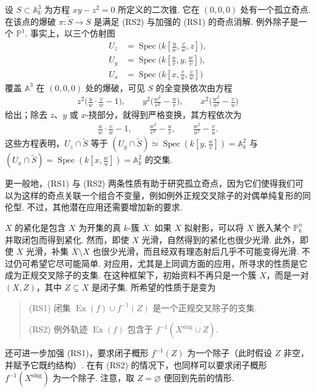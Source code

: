 \begin{example}\label{item:ag-4-1-4}
设 $S\subset\mathbb A_k^3$ 为方程 $xy-z^2=0$ 所定义的二次锥. 它在 $(0,0,0)$ 处有一个孤立奇点. 在该点的爆破 $\pi:\widetilde S\longrightarrow S$ 是满足 (RS2) 与加强的 (RS1) 的奇点消解. 例外除子是一个 $\mathbb P^1$.
事实上，以三个仿射图
\begin{align*}
U_z&=\operatorname{Spec}\bigl(k[\tfrac{u}{w},\tfrac{v}{w},z]\bigr),\\
U_y&=\operatorname{Spec}\bigl(k[\tfrac{u}{v},y,\tfrac{w}{v}]\bigr),\\
U_x&=\operatorname{Spec}\bigl(k[x,\tfrac{v}{u},\tfrac{v}{w}]\bigr)
\end{align*}
覆盖 $\mathbb A^3$ 在 $(0,0,0)$ 处的爆破，可见 $S$ 的全变换依次由方程
\begin{align*}
z^2\bigl(\tfrac{u}{w}\cdot\tfrac{v}{w}-1\bigr),\qquad
y^2\bigl(\tfrac{w^2}{v^2}-\tfrac{u}{v}\bigr),\qquad
x^2\bigl(\tfrac{w^2}{u^2}-\tfrac{v}{u}\bigr)
\end{align*}
给出；除去 $z$、$y$ 或 $x$-挠部分，就得到严格变换，其方程依次为
\begin{align*}
\tfrac{u}{w}\cdot\tfrac{v}{w}-1,\qquad
\tfrac{w^2}{v^2}-\tfrac{u}{v},\qquad
\tfrac{w^2}{u^2}-\tfrac{v}{u}.
\end{align*}
这些方程表明，$U_z\cap\widetilde S$ 等于 $(U_y\cap\widetilde S)\simeq\operatorname{Spec}(k[y,\tfrac{w}{v}])=\mathbb A_k^2$ 与 $(U_x\cap\widetilde S)=\operatorname{Spec}(k[x,\tfrac{w}{u}])=\mathbb A_k^2$ 的交集.
\end{example}
更一般地，(RS1) 与 (RS2) 两条性质有助于研究孤立奇点，因为它们使得我们可以为这样的奇点关联一个组合不变量，例如例外正规交叉除子的对偶单纯复形的同伦型.
不过，其他潜在应用还需要增加新的要求.
\begin{numpara}[与紧化的相容性]\label{item:ag-4-1-5}
$X$ 的紧化是包含 $X$ 为开集的真 $k$-簇 $\overline X$. 如果 $X$ 拟射影，可以将 $X$ 嵌入某个 $\mathbb P_k^n$ 并取闭包而得到紧化. 然而，即使 $X$ 光滑，自然得到的紧化也很少光滑. 此外，即使 $\overline X$ 光滑，补集 $\overline X\setminus X$ 也很少光滑，而且经双有理态射后几乎不可能变得光滑. 不过仍可希望它尽可能简单. 对应用，尤其是上同调方面的应用，所寻求的性质是它成为正规交叉除子的支集.
在这种框架下，初始资料不再只是一个簇 $X$，而是一对 $(X,Z)$，其中 $Z\subsetneq X$ 是闭子集. 所希望的性质于是变为
\begin{quote}
\textup{(RS1)} 闭集 $\operatorname{Ex}(f)\cup f^{-1}(Z)$ 是一个正规交叉除子的支集.

\textup{(RS2)} 例外轨迹 $\operatorname{Ex}(f)$ 包含于 $f^{-1}(X^{\mathrm{sing}}\cup Z)$.
\end{quote}
还可进一步加强 (RS1)，要求闭子概形 $f^{-1}(Z)$ 为一个除子（此时假设 $Z$ 非空，并赋予它既约结构）. 在有 (RS2) 的情况下，也同样可以要求闭子概形 $f^{-1}(X^{\mathrm{sing}})$ 为一个除子. 注意，取 $Z=\varnothing$ 便回到先前的情形.
\end{numpara}
